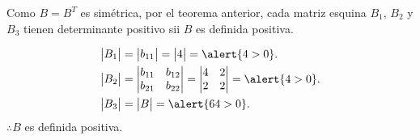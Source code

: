 \begin{frame}
	\begin{solution}
		Como $B=B^{T}$ es simétrica, por el teorema anterior, cada matriz
		esquina $B_{1}$, $B_{2}$ y $B_{3}$ tienen determinante positivo
		sii $B$ es definida positiva.

		\begin{align*}
			\begin{vmatrix}
				B_{1}
			\end{vmatrix}
			                & =
			\begin{vmatrix}
				b_{11}
			\end{vmatrix}=
			\begin{vmatrix}
				4
			\end{vmatrix}=
			\alert{4>0}.
			\\
			\begin{vmatrix}
				B_{2}
			\end{vmatrix} & =
			\begin{vmatrix}
				b_{11} & b_{12} \\
				b_{21} & b_{22}
			\end{vmatrix}=
			\begin{vmatrix}
				4 & 2 \\
				2 & 2
			\end{vmatrix}=
			\alert{4>0}.
			\\
			\begin{vmatrix}
				B_{3}
			\end{vmatrix} & =
			\begin{vmatrix}
				B
			\end{vmatrix}=
			\alert{64>0}.
		\end{align*}
		$\therefore B$ es definida positiva.

	\end{solution}
\end{frame}